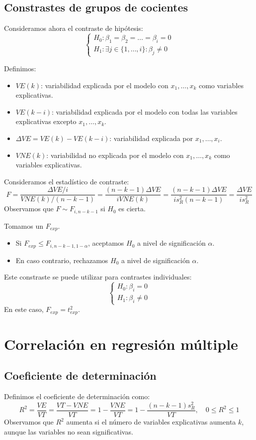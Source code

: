 \documentclass{report}
\theoremstyle{remark}
\theoremstyle{remark}
\theoremstyle{remark}
\theoremstyle{definition}
\theoremstyle{definition}
\theoremstyle{definition}
\begin{document}
\subsection*{Constrastes de grupos de cocientes}
Consideramos ahora el contraste de hipótesis:
$$\begin{cases}
        H_0: \beta_1 = \beta_2 = \dots = \beta_i = 0 \\
        H_1: \exists j \in \{1, \dots, i\} : \beta_j \neq 0
    \end{cases}$$

Definimos:
\begin{itemize}
    \item $VE(k)$: variabilidad explicada por el modelo con $x_1, \dots, x_k$ como variables explicativas.
    \item $VE(k-i)$: variabilidad explicada por el modelo con todas las variables explicativas excepto $x_1, \dots, x_k$.
    \item $\Delta VE = VE(k) - VE(k-i)$: variabilidad explicada por $x_1, \dots, x_i$.
    \item $VNE(k)$: variabilidad no explicada por el modelo con $x_1, \dots, x_k$ como variables explicativas.
\end{itemize}

Consideramos el estadístico de contraste:
$$F = \frac{\Delta VE / i}{VNE(k) / (n-k-1)} = \frac{(n-k-1)\Delta VE}{iVNE(k)} = \frac{(n-k-1)\Delta VE}{is_R^2(n-k-1)} = \frac{\Delta VE}{is_R^2}$$
Observamos que $F \sim F_{i, n-k-1}$ si $H_0$ es cierta.

Tomamos un $F_{exp}$.
\begin{itemize}
    \item Si $F_{exp} \leq F_{i, n-k-1, 1-\alpha}$, aceptamos $H_0$ a nivel de significación $\alpha$.
    \item En caso contrario, rechazamos $H_0$ a nivel de significación $\alpha$.
\end{itemize}

Este constraste se puede utilizar para contrastes individuales:
$$\begin{cases}
        H_0: \beta_i = 0 \\
        H_1: \beta_i \neq 0
    \end{cases}$$
En este caso, $F_{exp} = t_{exp}^2$.

\section{Correlación en regresión múltiple}
\subsection*{Coeficiente de determinación}
Definimos el coeficiente de determinación como:
$$R^2 = \frac{VE}{VT} = \frac{VT - VNE}{VT} = 1 - \frac{VNE}{VT} = 1 - \frac{(n-k-1)s_R^2}{VT}, \quad 0 \leq R^2 \leq 1$$
Observamos que $R^2$ aumenta si el número de variables explicativas aumenta $k$, aunque las variables no sean significativas.
\end{document}
